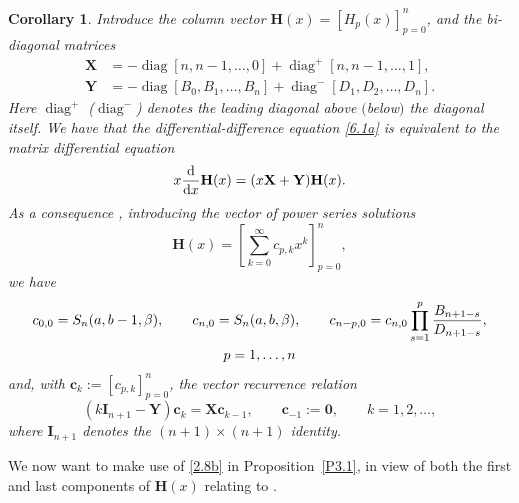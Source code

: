 \documentclass[pdftex]{sigma}
\numberwithin{equation}{section}
\newtheorem{Corollary}[Theorem]{Corollary}
\theoremstyle{definition}
\begin{document}
\begin{Corollary}
 Introduce the column vector $\mathbf H(x) = [H_p(x)]_{p=0}^n$, and the bi-diagonal matrices
\begin{align*}%
\mathbf X & = - \operatorname{diag} [n, n - 1,\dots,0] + \operatorname{diag}^+ [n,n-1,\dots,1] , \\
\mathbf Y & = - \operatorname{diag} [B_0, B_1,\dots, B_n] + \operatorname{diag}^- [D_1, D_2,\dots, D_n].
\end{align*}
Here $\operatorname{diag}^+$ {\rm (}$\operatorname{diag}^-${\rm )} denotes the leading diagonal above $($below$)$ the diagonal itself.
We have that the differential-difference equation \eqref{6.1a} is equivalent to the matrix differential equation
\begin{equation}\label{MD}
x {{\rm d} \over {\rm d}x} \mathbf H(x) = (x \mathbf X + \mathbf Y) \mathbf H(x).
\end{equation}
As a consequence {\rm\cite[\emph{Remark} 4.19]{FK22}}, introducing the vector of power series solutions
\[
 \mathbf H(x) = \left [ \sum_{k=0}^\infty c_{p,k} x^k \right ]_{p=0}^n,
\]
 we have
\begin{gather*}
 c_{0,0} = S_n(a,b-1,\beta), \qquad c_{n,0} = S_n(a,b,\beta), \qquad
 c_{n - p,0} = c_{n,0} \prod_{s=1}^p {B_{n+1-s} \over D_{n+1-s}}, \\ p=1,\dots,n
\end{gather*}
 and, with $\mathbf c_k := [ c_{p,k} ]_{p=0}^n$, the vector recurrence relation
 \begin{equation}\label{MD3}
 (k {\mathbf I}_{n+1} - \mathbf Y) \mathbf c_k = \mathbf X \mathbf c_{k-1}, \qquad\mathbf c_{-1} := \mathbf 0,\qquad k=1,2,\dots,
 \end{equation}
 where $\mathbf{I}_{n+1}$ denotes the $(n+1) \times (n+1)$ identity.
\end{Corollary}

We now want to make use of \eqref{2.8b} in
Proposition~\ref{P3.1}, in view of both the first and last components of $\mathbf H(x)$ relating to .
\end{document}

